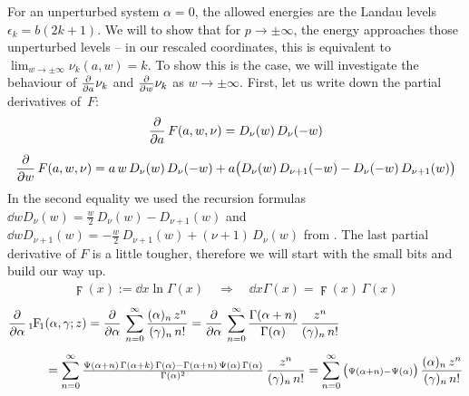 For an unperturbed system $\alpha=0$, the allowed energies are the Landau levels $\epsilon_k = b(2k+1)$. We will to show that for $p\to\pm\infty$, the energy approaches those unperturbed levels – in our rescaled coordinates, this is equivalent to $\lim_{w\to\pm\infty} \nu_k(a, w) = k$. To show this is the case, we will investigate the behaviour of $\frac{\partial }{\partial a} \nu_k$ and $\frac{\partial }{\partial w} \nu_k$ as $w \to \pm\infty$. First, let us write down the partial derivatives of~$F$:
\begin{gather*}
    \frac{\partial }{\partial a} \, F(a,w,\nu) = D_\nu(w) \, D_\nu(-w)
    \\[5pt]
    \frac{\partial }{\partial w} \, F(a,w,\nu)
    = a \, w \, D_\nu(w) \, D_\nu(-w)
    + a \big(
        D_\nu(w) \, D_{\nu + 1}(-w) - D_\nu(-w) \, D_{\nu+1}(w)
    \big)
\end{gather*}
In the second equality we used the recursion formulas $\dd{}{w} D_\nu(w) = \frac{w}{2} \, D_\nu(w) - D_{\nu+1}(w)$ and $\dd{}{w} D_{\nu+1}(w) = -\frac{w}{2} \, D_{\nu+1}(w) + (\nu+1) \, D_\nu(w)$ from \cite{GradshteynRyzhik}. The last partial derivative of $F$ is a little tougher, therefore we will start with the small bits and build our way up.
\begin{align*}
    \digamma(x) := \dd{}{x} \ln \Gamma(x)
    \quad \Longrightarrow \quad
    \dd{}{x} \Gamma(x) = \digamma(x) \, \Gamma(x)
\end{align*}
\begin{align*}
    \pd{}{\alpha} \, \hypF&(\alpha, \gamma; z)
    = \pd{}{\alpha} \, \sum_{n=0}^\infty \frac{(\alpha)_n \, z^n}{(\gamma)_n \, n!}
    = \pd{}{\alpha} \, \sum_{n=0}^\infty \frac{\Gamma(\alpha+n)}{\Gamma(\alpha)} \, \frac{z^n}{(\gamma)_n \, n!}
    \\[5pt]
    &= \sum_{n=0}^\infty \tfrac{\digamma(\alpha+n) \, \Gamma(\alpha+k) \, \Gamma(\alpha) - \Gamma(\alpha+n) \, \digamma(\alpha) \, \Gamma(\alpha)}{\Gamma(\alpha)^2} \, \frac{z^n}{(\gamma)_n \, n!}
    = \sum_{n=0}^\infty \big({ \scriptstyle \digamma(\alpha+n) - \digamma(\alpha) }\big) \, \frac{(\alpha)_n \, z^n}{(\gamma)_n \, n!}
\end{align*}
